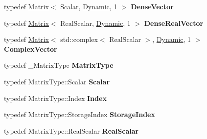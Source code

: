 \begin{DoxyCompactItemize}
\item 
\mbox{\label{class_eigen_1_1_d_g_m_r_e_s_a1d85b943c99dabf606c6c537e550b11b}} 
typedef \hyperlink{group___core___module_class_eigen_1_1_matrix}{Matrix}$<$ Scalar, \hyperlink{namespace_eigen_ad81fa7195215a0ce30017dfac309f0b2}{Dynamic}, 1 $>$ {\bfseries Dense\+Vector}
\item 
\mbox{\label{class_eigen_1_1_d_g_m_r_e_s_a9ffdf6b47010f636fcc1a071a9e9e16c}} 
typedef \hyperlink{group___core___module_class_eigen_1_1_matrix}{Matrix}$<$ Real\+Scalar, \hyperlink{namespace_eigen_ad81fa7195215a0ce30017dfac309f0b2}{Dynamic}, 1 $>$ {\bfseries Dense\+Real\+Vector}
\item 
\mbox{\label{class_eigen_1_1_d_g_m_r_e_s_aeace9fdbc1373362c29409003482d66a}} 
typedef \hyperlink{group___core___module_class_eigen_1_1_matrix}{Matrix}$<$ std\+::complex$<$ Real\+Scalar $>$, \hyperlink{namespace_eigen_ad81fa7195215a0ce30017dfac309f0b2}{Dynamic}, 1 $>$ {\bfseries Complex\+Vector}
\item 
\mbox{\label{class_eigen_1_1_d_g_m_r_e_s_abebf2c0dc490d410fbf5f24dedc60712}} 
typedef \+\_\+\+Matrix\+Type {\bfseries Matrix\+Type}
\item 
\mbox{\label{class_eigen_1_1_d_g_m_r_e_s_aa2172314b09dbddeb3661ca9c809b371}} 
typedef Matrix\+Type\+::\+Scalar {\bfseries Scalar}
\item 
\mbox{\label{class_eigen_1_1_d_g_m_r_e_s_a8f6716ac7b42e0c4879c6fec42fe0193}} 
typedef Matrix\+Type\+::\+Index {\bfseries Index}
\item 
\mbox{\label{class_eigen_1_1_d_g_m_r_e_s_a5e96d9b5ca6098272003550ef87c32d2}} 
typedef Matrix\+Type\+::\+Storage\+Index {\bfseries Storage\+Index}
\item 
\mbox{\label{class_eigen_1_1_d_g_m_r_e_s_a7e47d437b590be8af0e9972e60adbe34}} 
typedef Matrix\+Type\+::\+Real\+Scalar {\bfseries Real\+Scalar}
\item 
\mbox{\label{class_eigen_1_1_d_g_m_r_e_s_acae98b6f30d350a136ed4bc3a270834b}} 

\end{DoxyCompactItemize}
